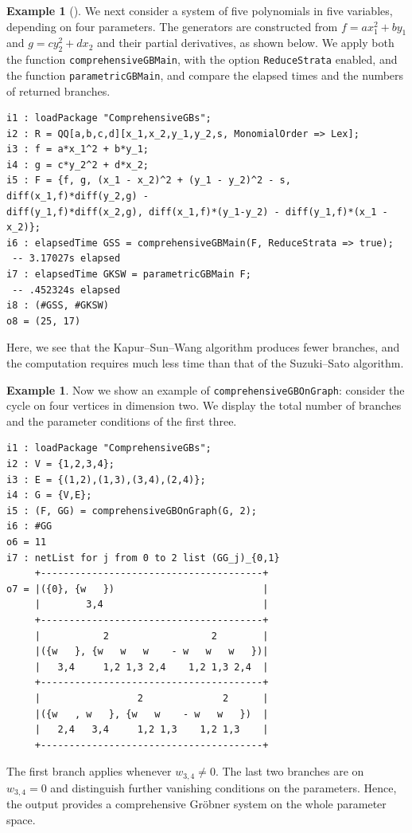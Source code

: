 \documentclass[11pt]{amsart}
\theoremstyle{plain}
\theoremstyle{definition}
\newtheorem{example}[theorem]{Example}
\theoremstyle{remark}
\begin{document}
\begin{example}[{\cite[Example~3]{SS}}]
We next consider a system of five polynomials in
five variables, depending on four parameters.
The generators are constructed from
$f=ax_1^2+by_1$ and $g=cy_2^2+dx_2$ and their
partial derivatives, as shown below.
We apply both the function \texttt{comprehensiveGBMain}, with
the option \texttt{ReduceStrata} enabled, and the function \texttt{parametricGBMain},
and compare the elapsed times and the numbers of
returned branches.

\begin{lstlisting}
i1 : loadPackage "ComprehensiveGBs";
i2 : R = QQ[a,b,c,d][x_1,x_2,y_1,y_2,s, MonomialOrder => Lex];    
i3 : f = a*x_1^2 + b*y_1;       
i4 : g = c*y_2^2 + d*x_2;
i5 : F = {f, g, (x_1 - x_2)^2 + (y_1 - y_2)^2 - s, diff(x_1,f)*diff(y_2,g) - 
diff(y_1,f)*diff(x_2,g), diff(x_1,f)*(y_1-y_2) - diff(y_1,f)*(x_1 - x_2)};
i6 : elapsedTime GSS = comprehensiveGBMain(F, ReduceStrata => true);
 -- 3.17027s elapsed
i7 : elapsedTime GKSW = parametricGBMain F;
 -- .452324s elapsed
i8 : (#GSS, #GKSW)
o8 = (25, 17)
\end{lstlisting}

Here, we see that the Kapur--Sun--Wang algorithm produces fewer branches, and the computation requires much less time than that of the Suzuki--Sato algorithm.
\end{example}

\begin{example}
Now we show an example of \texttt{comprehensiveGBOnGraph}: consider the cycle on four vertices in dimension two.
We display the total number of branches and the
parameter conditions of the first three.
\begin{lstlisting}
i1 : loadPackage "ComprehensiveGBs";
i2 : V = {1,2,3,4};
i3 : E = {(1,2),(1,3),(3,4),(2,4)};
i4 : G = {V,E};
i5 : (F, GG) = comprehensiveGBOnGraph(G, 2);
i6 : #GG
o6 = 11
i7 : netList for j from 0 to 2 list (GG_j)_{0,1}
     +---------------------------------------+
o7 = |({0}, {w   })                          |
     |        3,4                            |
     +---------------------------------------+
     |           2                  2        |
     |({w   }, {w   w   w    - w   w   w   })|
     |   3,4     1,2 1,3 2,4    1,2 1,3 2,4  |
     +---------------------------------------+
     |                 2              2      |
     |({w   , w   }, {w   w    - w   w   })  |
     |   2,4   3,4     1,2 1,3    1,2 1,3    |
     +---------------------------------------+
\end{lstlisting}

The first branch applies whenever $w_{3,4}\neq 0$. The last two branches are on $w_{3,4}=0$ and distinguish further vanishing conditions on the parameters. Hence, the output provides a comprehensive Gröbner system on the whole parameter space.
\end{example}
\end{document}
